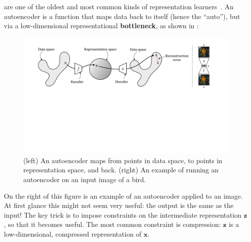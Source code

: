  are one of the oldest and most common kinds of representation learners~\cite{rumelhart1985learning, ballard1987modular}. An autoencoder is a function that maps data back to itself (hence the ``auto''), but via a low-dimensional representational \textbf{bottleneck}, as shown in \fig{\ref{fig:representation_learning:autoencoder_diagram}}:
\begin{figure}[h!]
    \centerline{
        \includegraphics[width=1.0\linewidth]{figures/representation_learning/autoencoder_diagram.pdf}
    }
    \caption{{\small (left) An autoencoder maps from points in data space, to points in representation space, and back. (right) An example of running an autoencoder on an input image of a bird.}}\label{fig:representation_learning:autoencoder_diagram}
\end{figure}

On the right of this figure is an example of an autoencoder applied to an image. At first glance this might not seem very useful: the output is the same as the input! The key trick is to impose constraints on the intermediate representation $\mathbf{z}$, so that it becomes useful. The most common constraint is compression: $\mathbf{z}$ is a low-dimensional, compressed representation of $\mathbf{x}$.

